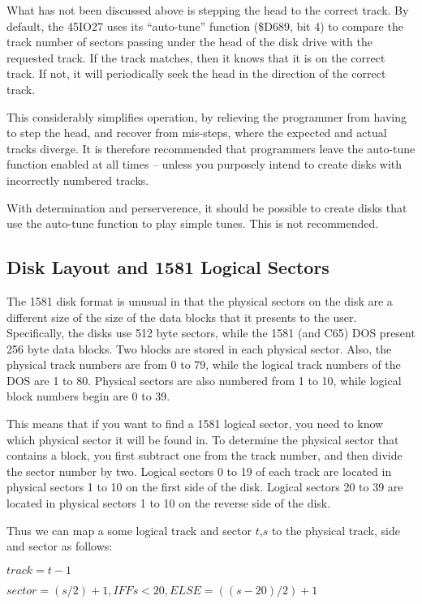 What has not been discussed above is stepping the head to the correct
track.  By default, the 45IO27 uses its ``auto-tune'' function (\$D689,
bit 4) to compare the track number of sectors passing under the head
of the disk drive with the requested track.  If the track matches,
then it knows that it is on the correct track.  If not, it will
periodically seek the head in the direction of the correct track.

This considerably simplifies operation, by relieving the programmer
from having to step the head, and recover from mis-steps, where the
expected and actual tracks diverge. It is therefore recommended that
programmers leave the auto-tune function enabled at all times --
unless you purposely intend to create disks with incorrectly numbered
tracks.

With determination and perserverence, it should be possible
to create disks that use the auto-tune function to play simple tunes.
This is not recommended.

\subsection{Disk Layout and 1581 Logical Sectors}

The 1581 disk format is unusual in that the physical sectors on the
disk are a different size of the size of the data blocks that it
presents to the user.  Specifically, the disks use 512 byte sectors,
while the 1581 (and C65) DOS present 256 byte data blocks.
Two blocks are stored in each physical sector.  Also, the physical
track numbers are from 0 to 79, while the logical track numbers of the
DOS are 1 to 80.  Physical sectors are also numbered from 1 to 10,
while logical block numbers begin are 0 to 39.

This means that if you want to find a 1581 logical sector, you need to
know which physical sector it will be found in.  To determine the
physical sector that contains a block, you first subtract one from the
track number, and then divide the sector number by two.  Logical
sectors 0 to 19 of each track are located in physical sectors 1 to 10
on the first side of the disk.  Logical sectors 20 to 39 are 
located in physical sectors 1 to 10 on the reverse side of the disk.  

Thus we can map a some logical track and sector $t$,$s$ to the
physical track, side and sector as follows:

$track = t - 1$

$sector = (s/2)+1, IFF s < 20, ELSE = ((s-20)/2) + 1$

